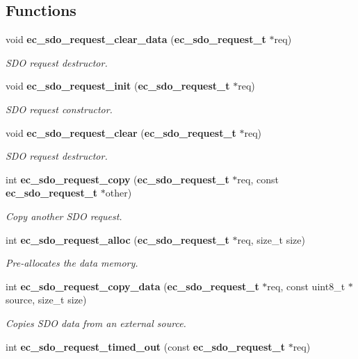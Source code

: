\subsection*{Functions}
\begin{DoxyCompactItemize}
\item 
void {\bf ec\-\_\-sdo\-\_\-request\-\_\-clear\-\_\-data} ({\bf ec\-\_\-sdo\-\_\-request\-\_\-t} $\ast$req)
\begin{DoxyCompactList}\small\item\em S\-D\-O request destructor. \end{DoxyCompactList}\item 
void {\bf ec\-\_\-sdo\-\_\-request\-\_\-init} ({\bf ec\-\_\-sdo\-\_\-request\-\_\-t} $\ast$req)
\begin{DoxyCompactList}\small\item\em S\-D\-O request constructor. \end{DoxyCompactList}\item 
void {\bf ec\-\_\-sdo\-\_\-request\-\_\-clear} ({\bf ec\-\_\-sdo\-\_\-request\-\_\-t} $\ast$req)
\begin{DoxyCompactList}\small\item\em S\-D\-O request destructor. \end{DoxyCompactList}\item 
int {\bf ec\-\_\-sdo\-\_\-request\-\_\-copy} ({\bf ec\-\_\-sdo\-\_\-request\-\_\-t} $\ast$req, const {\bf ec\-\_\-sdo\-\_\-request\-\_\-t} $\ast$other)
\begin{DoxyCompactList}\small\item\em Copy another S\-D\-O request. \end{DoxyCompactList}\item 
int {\bf ec\-\_\-sdo\-\_\-request\-\_\-alloc} ({\bf ec\-\_\-sdo\-\_\-request\-\_\-t} $\ast$req, size\-\_\-t size)
\begin{DoxyCompactList}\small\item\em Pre-\/allocates the data memory. \end{DoxyCompactList}\item 
int {\bf ec\-\_\-sdo\-\_\-request\-\_\-copy\-\_\-data} ({\bf ec\-\_\-sdo\-\_\-request\-\_\-t} $\ast$req, const uint8\-\_\-t $\ast$source, size\-\_\-t size)
\begin{DoxyCompactList}\small\item\em Copies S\-D\-O data from an external source. \end{DoxyCompactList}\item 
int {\bf ec\-\_\-sdo\-\_\-request\-\_\-timed\-\_\-out} (const {\bf ec\-\_\-sdo\-\_\-request\-\_\-t} $\ast$req)

\end{DoxyCompactItemize}
